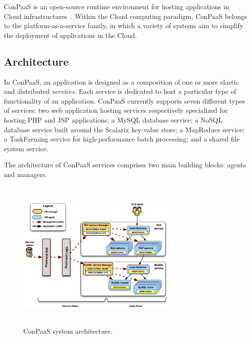 

ConPaaS is an open-source runtime environment for hosting applications
in Cloud infrastructures~\cite{conpaasIC}.  Within the Cloud computing
paradigm, ConPaaS belongs to the platform-as-a-service family, in
which a variety of systems aim to simplify the deployment of
applications in the Cloud.


\subsection*{Architecture}

In ConPaaS, an application is designed as a composition of one or more
elastic and distributed \emph{services}. Each service is dedicated to
host a particular type of functionality of an application. ConPaaS
currently supports seven different types of services: two web
application hosting services respectively specialized for hosting PHP
and JSP applications; a MySQL database service; a NoSQL database
service built around the Scalarix key-value store; a MapReduce
service; a TaskFarming service for high-performance batch
processing; and a shared file system service.

The architecture of ConPaaS services comprises two main building
blocks: agents and managers.

\begin{figure}[Ht]
\begin{center}
\includegraphics[width=0.7\textwidth, height=7.5cm]{./images/conpaasSystemArch_2}
\end{center}
\vspace{-5mm}
\caption{ConPaaS system architecture.}
\label{arch}
\end{figure}

